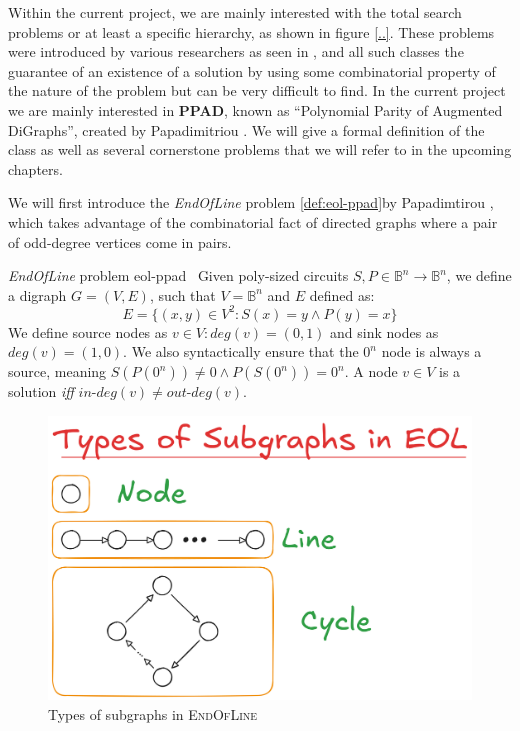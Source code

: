 Within the current project, we are mainly interested with the total search problems or at least a specific hierarchy,
as shown in figure \ref{..}. These problems were introduced by various researchers as seen in {},
and all such classes the guarantee of an existence of a solution by using
some combinatorial property of the nature of the problem but can be very difficult to find. In the current project we are mainly interested
in \textbf{PPAD}, known as ``Polynomial Parity of Augmented DiGraphs'', created by Papadimitriou \cite{papadimitriou_ComplexityParityArgument_1994}.
We will give a formal definition of the class as well as several cornerstone problems that we will refer to in the upcoming chapters.

We will first introduce the \textit{EndOfLine} problem \ref{def:eol-ppad}by Papadimtirou \cite{papadimitriou_ComplexityParityArgument_1994},
which takes advantage of the combinatorial fact of directed graphs where a pair of odd-degree vertices come in pairs.

\begin{definitionbox}{\textit{EndOfLine} problem \cite{papadimitriou_ComplexityParityArgument_1994}}{eol-ppad}\
    \label{def:eol-ppad}
    Given poly-sized circuits $S, P \in \mathbb{B}^n \to \mathbb{B}^n$,
    we define a digraph $G = (V,E)$, such that $V= \mathbb{B}^n$ and $E$ defined as:
    $$
        E = \{(x,y) \in V^2: S(x) = y \wedge P(y) = x\}
    $$
    We define source nodes as $v \in V: \textit{deg}(v) = (0,1)$  and sink nodes as
    $\textit{deg}(v) = (1,0)$.
    We also syntactically ensure that the $0^n$ node is always a source, meaning
    $S(P(0^n)) \neq 0 \wedge P(S(0^n)) = 0^n$.
    A node $v \in V$ is a solution \textit{iff} $\textit{in-deg}(v) \neq \textit{out-deg}(v)$.
\end{definitionbox}

\begin{figure}
    \centering
    \includegraphics[width=0.7\linewidth]{assets/eol-subgraphs.png}
    \caption{Types of subgraphs in \textsc{EndOfLine}}
    \label{fig:eol-subgraphs}
\end{figure}


